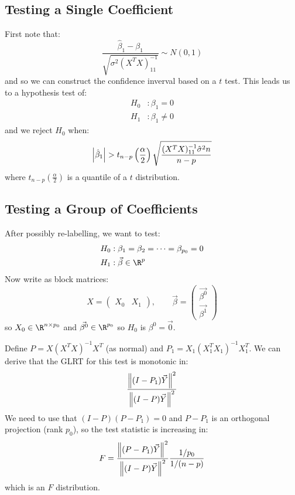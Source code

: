 \documentclass[../Main.tex]{subfiles}
\begin{document}
\subsection{Testing a Single Coefficient}
First note that:
\begin{equation*}
    \frac{\hat{\beta}_1 - \beta_1}{\sqrt{\sigma^2(X^TX)^{-1}_{11}}} \sim N(0, 1)
\end{equation*}
and so we can construct the confidence inverval based on a $t$ test. This leads us to a hypothesis test of:
\begin{align*}
    H_0&: \beta_1 = 0 \\
    H_1 &: \beta_1 \neq 0
\end{align*}
and we reject $H_0$ when:
\begin{equation*}
    \left|\hat{\beta}_1\right| > t_{n-p}\left(\frac{\alpha}{2}\right) \sqrt{\frac{(X^TX)^{-1}_{11} \hat{\sigma}^2 n}{n-p}}
\end{equation*}
where $t_{n-p}\left(\frac\alpha2\right)$ is a quantile of a $t$ distribution.
\subsection{Testing a Group of Coefficients}
After possibly re-labelling, we want to test:
\begin{align*}
    H_0&: \beta_1 = \beta_2 = \cdots = \beta_{p_0} = 0 \\
    H_1&: \vec{\beta} \in \R^p
\end{align*}
Now write as block matrices:
\begin{equation*}
    X = \begin{pmatrix}X_0 & X_1\end{pmatrix},\qquad \vec{\beta} = \begin{pmatrix}\vec{\beta^0} \\ \vec{\beta^1}\end{pmatrix}
\end{equation*}
so $X_0 \in \R^{n \times p_0}$ and $\vec{\beta^0} \in \R^{p_0}$ so $H_0$ is $\beta^0 = \vec0$.

Define $P = X(X^TX)^{-1} X^T$ (as normal) and $P_1 = X_1(X_1^TX_1)^{-1} X_1^T$. We can derive that the GLRT for this test is monotonic in:
\begin{equation*}
    \frac{\left\|(I - P_1)\vec{Y}\right\|^2}{\left\|(I - P)\vec{Y}\right\|^2}
\end{equation*}
We need to use that $(I-P)(P - P_1) = 0$ and $P - P_1$ is an orthogonal projection (rank $p_0$), so the test statistic is increasing in:
\begin{equation*}
    F = \frac{\left\|(P - P_1)\vec{Y}\right\|^2}{\left\|(I - P)\vec{Y}\right\|^2} \frac{1 / p_0}{1 / (n-p)}
\end{equation*}
which is an $F$ distribution.
\end{document}

